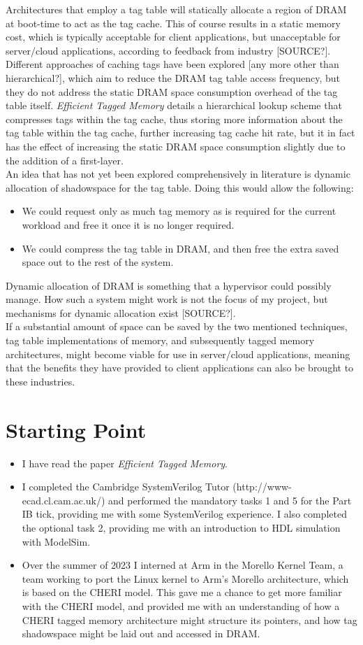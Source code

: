 \documentclass[10pt,a4paper]{article}
\begin{document}
Architectures that employ a tag table will statically allocate a region of DRAM at boot-time to act as the tag cache. This of course results in a static memory cost, which is typically acceptable for client applications, but unacceptable for server/cloud applications, according to feedback from industry [SOURCE?]. Different approaches of caching tags have been explored [any more other than hierarchical?], which aim to reduce the DRAM tag table access frequency, but they do not address the static DRAM space consumption overhead of the tag table itself. \textit{Efficient Tagged Memory} details a hierarchical lookup scheme that compresses tags within the tag cache, thus storing more information about the tag table within the tag cache, further increasing tag cache hit rate, but it in fact has the effect of increasing the static DRAM space consumption slightly due to the addition of a first-layer.\\
An idea that has not yet been explored comprehensively in literature is dynamic allocation of shadowspace for the tag table. Doing this would allow the following:
\begin{itemize}
\item We could request only as much tag memory as is required for the current workload and free it once it is no longer required.
\item We could compress the tag table in DRAM, and then free the extra saved space out to the rest of the system.
\end{itemize}
Dynamic allocation of DRAM is something that a hypervisor could possibly manage. How such a system might work is not the focus of my project, but mechanisms for dynamic allocation exist [SOURCE?].\\
If a substantial amount of space can be saved by the two mentioned techniques, tag table implementations of memory, and subsequently tagged memory architectures, might become viable for use in server/cloud applications, meaning that the benefits they have provided to client applications can also be brought to these industries.

\section*{Starting Point}
\begin{itemize}
	\item I have read the paper \textit{Efficient Tagged Memory}.
	\item I completed the Cambridge SystemVerilog Tutor (http://www-ecad.cl.cam.ac.uk/) and performed the mandatory tasks 1 and 5 for the Part IB tick, providing me with some SystemVerilog experience. I also completed the optional task 2, providing me with an introduction to HDL simulation with ModelSim.
	\item Over the summer of 2023 I interned at Arm in the Morello Kernel Team, a team working to port the Linux kernel to Arm's Morello architecture, which is based on the CHERI model. This gave me a chance to get more familiar with the CHERI model, and provided me with an understanding of how a CHERI tagged memory architecture might structure its pointers, and how tag shadowspace might be laid out and accessed in DRAM.
\end{itemize}
\end{document}
